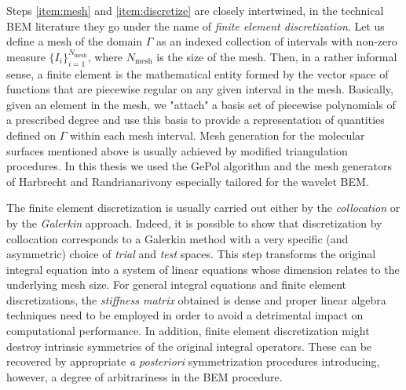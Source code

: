 Steps \ref{item:mesh} and \ref{item:discretize} are closely intertwined,
in the technical \acrshort{BEM} literature they go under the name of
\emph{finite element discretization}.
Let us define a mesh of the domain $\Gamma$ as an indexed collection of
intervals with non-zero measure $\lbrace I_i\rbrace_{i=1}^{N_\mathrm{mesh}}$, where
$N_\mathrm{mesh}$ is the size of the mesh.
Then, in a rather informal sense, a finite element is the
mathematical entity formed by the vector space of functions that are
piecewise regular on any given interval in the mesh.\autocite{Ern2004-oo}
Basically, given an element in the mesh, we "attach" a basis set of
piecewise polynomials of a prescribed degree and use this basis to
provide a representation of quantities defined on $\Gamma$ within each
mesh interval.
Mesh generation for the molecular surfaces mentioned above is usually
achieved by modified triangulation procedures. In this thesis we used
the GePol algorithm\autocite{Pascual-Ahuir1987-uo, Pascual-Ahuir1990-lp,
Pomelli1998-qp, Pomelli2001-sj, Frediani2004-ua, Pomelli2007-wq}
and the mesh generators of Harbrecht and Randrianarivony especially
tailored for the wavelet \acrshort{BEM}.\autocite{Harbrecht2009-no,
Harbrecht2011-dk}

The finite element discretization is usually carried out either by the
\emph{collocation} or by the \emph{Galerkin} approach.
Indeed, it is possible to show that discretization by collocation
corresponds to a Galerkin method with a very specific (and asymmetric)
choice of \emph{trial} and \emph{test}
spaces.\autocite{Hackbusch1995-uq, Ern2004-oo}
This step transforms the original integral equation into a system of
linear equations whose dimension relates to the underlying mesh size.
For general integral equations and finite element discretizations,
the \emph{stiffness matrix} obtained is dense and proper linear algebra
techniques need to be employed in order to avoid a detrimental impact on
computational performance.
In addition, finite element discretization might destroy intrinsic
symmetries of the original integral
operators. These can be recovered by appropriate \emph{a posteriori}
symmetrization procedures introducing, however, a degree of
arbitrariness in the \acrshort{BEM} procedure.\autocite{Lange2011-eu}

